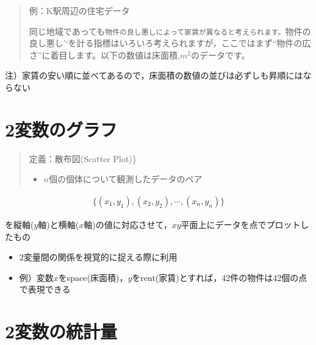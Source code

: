 \documentclass[
]{book}
\providecommand{\tightlist}{%
  \setlength{\itemsep}{0pt}\setlength{\parskip}{0pt}}
\theoremstyle{definition}
\theoremstyle{definition}
\theoremstyle{definition}
\theoremstyle{definition}
\theoremstyle{remark}
\begin{document}
\begin{quote}
例：K駅周辺の住宅データ

同じ地域であっても\texttt{物件の良し悪し\textquotesingle{}\textquotesingle{}によって家賃が異なると考えられます。}物件の良し悪し'`を計る指標はいろいろ考えられますが，ここではまず``物件の広さ''に着目します。以下の数値は床面積,\(m^2\)のデータです。
\end{quote}

注）家賃の安い順に並べてあるので，床面積の数値の並びは必ずしも昇順にはならない

\hypertarget{ux5909ux6570ux306eux30b0ux30e9ux30d5}{%
\section{2変数のグラフ}\label{ux5909ux6570ux306eux30b0ux30e9ux30d5}}

\begin{quote}
定義：散布図(Scatter Plot)\}

\begin{itemize}
\tightlist
\item
  \(n\)個の個体について観測したデータのペア
\end{itemize}
\end{quote}

\begin{align*}
\{ (x_1,y_1), (x_2,y_2), \cdots, (x_n,y_n) \}
\end{align*}

を縦軸(\(y\)軸)と横軸(\(x\)軸)の値に対応させて，\(xy\)平面上にデータを点でプロットしたもの

\begin{itemize}
\item
  2変量間の関係を視覚的に捉える際に利用
\item
  例）変数\(x\)をspace(床面積)，\(y\)をrent(家賃)とすれば，42件の物件は42個の点で表現できる
\end{itemize}

\hypertarget{ux5909ux6570ux306eux7d71ux8a08ux91cf}{%
\section{2変数の統計量}\label{ux5909ux6570ux306eux7d71ux8a08ux91cf}}
\end{document}
